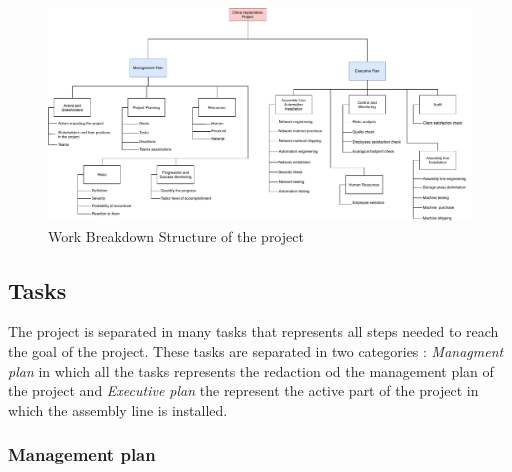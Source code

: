 \begin{figure}[h]

\centering
\includegraphics[scale=0.5]{Img/wbs-management-inter.pdf}
\caption{Work Breakdown Structure of the project}

\end{figure}

\subsection{Tasks}

The project is separated in many tasks that represents all steps needed to reach the goal of the project.
These tasks are separated in two categories : \emph{Managment plan} in which all the tasks represents the redaction od the management plan of the project and \emph{Executive plan} the represent the active part of the project in which the assembly line is installed.

\subsubsection{Management plan}

